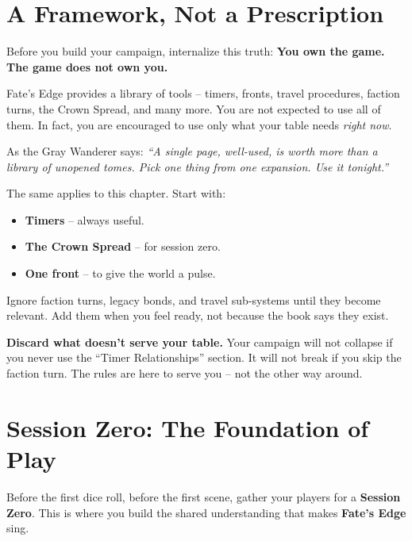 \section{A Framework, Not a Prescription}
\label{sec:framework-mindset}

Before you build your campaign, internalize this truth: \textbf{You own the game. The game does not own you.}

Fate's Edge provides a library of tools -- timers, fronts, travel procedures, faction turns, the Crown Spread, and many more. You are not expected to use all of them. In fact, you are encouraged to use only what your table needs \emph{right now}.

\begin{tcolorbox}[colback=gray!5!white, colframe=gray!75!black, title={The 10\% Rule},breakable]
As the Gray Wanderer says: \textit{``A single page, well-used, is worth more than a library of unopened tomes. Pick one thing from one expansion. Use it tonight.''}

The same applies to this chapter. Start with:
\begin{itemize}
  \item \textbf{Timers} -- always useful.
  \item \textbf{The Crown Spread} -- for session zero.
  \item \textbf{One front} -- to give the world a pulse.
\end{itemize}

Ignore faction turns, legacy bonds, and travel sub-systems until they become relevant. 
Add them when you feel ready, not because the book says they exist.

\textbf{Discard what doesn't serve your table.} Your campaign will not collapse if you never use the ``Timer Relationships'' section. It will not break if you skip the faction turn. The rules are here to serve you -- not the other way around.
\end{tcolorbox}

\section{Session Zero: The Foundation of Play}
\label{sec:gm-session-zero}

Before the first dice roll, before the first scene, gather your players for a \textbf{Session Zero}. This is where you build the shared understanding that makes \textbf{Fate's Edge} sing.

